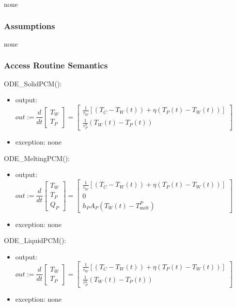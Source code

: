 \documentclass[12pt]{article}
\begin{document}
none

\subsubsection{Assumptions}

none

\subsubsection{Access Routine Semantics}

ODE\_SolidPCM(): 
\renewcommand*{\arraystretch}{1.5}
\begin{itemize}
\item output: $out := 
\dfrac{d}{dt} \left [ 
\begin{array}{c}
T_W\\
T_P 
\end{array} 
\right] =
\left [ 
\begin{array}{c}
\frac{1}{\tau_W}[(T_C - T_W(t)) + {\eta}(T_P(t) - T_W(t))]\\
\frac{1}{\tau^S_P}(T_W(t) - T_P(t)) 
\end{array} 
\right]
$
\item exception: none
\end{itemize}

ODE\_MeltingPCM(): 
\renewcommand*{\arraystretch}{1.5}
\begin{itemize}
\item output: $out := 
\dfrac{d}{dt} \left [ 
\begin{array}{c}
T_W\\
T_P\\
Q_P 
\end{array} 
\right] =
\left [ 
\begin{array}{c}
\frac{1}{\tau_W}[(T_C - T_W(t)) + {\eta}(T_P(t) - T_W(t))]\\
0 \\
h_P A_P (T_W(t) - T_\text{melt}^P)
\end{array} 
\right]
$
\item exception: none
\end{itemize}

ODE\_LiquidPCM(): 
\renewcommand*{\arraystretch}{1.5}
\begin{itemize}
\item output: $out := 
\dfrac{d}{dt} \left [ 
\begin{array}{c}
T_W\\
T_P
\end{array} 
\right] =
\left [ 
\begin{array}{c}
\frac{1}{\tau_W}[(T_C - T_W(t)) + {\eta}(T_P(t) - T_W(t))]\\
\frac{1}{\tau^L_P}(T_W(t) - T_P(t))
\end{array} 
\right]
$
\item exception: none
\end{itemize}
\end{document}
